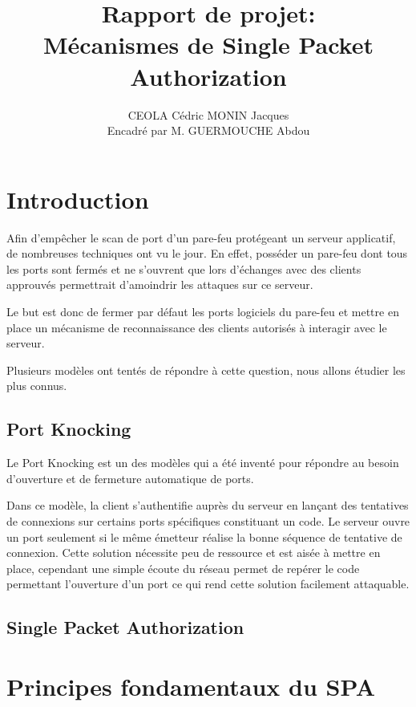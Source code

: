 \documentclass[12pt]{article}
\title{Rapport de projet:\\
Mécanismes de Single Packet Authorization}
\author{CEOLA Cédric MONIN Jacques\\
Encadré par M. GUERMOUCHE Abdou}
\begin{document}
\maketitle

\clearpage                  
\tableofcontents
\clearpage

\section{Introduction}

Afin d'empêcher le scan de port d'un pare-feu protégeant un serveur applicatif, de nombreuses techniques ont vu le jour. En effet, posséder un pare-feu dont tous les ports sont fermés et ne s'ouvrent que lors d'échanges avec des clients approuvés permettrait d'amoindrir les attaques sur ce serveur.

Le but est donc de fermer par défaut les ports logiciels du pare-feu et mettre en place un mécanisme de reconnaissance des clients autorisés à interagir avec le serveur.

Plusieurs modèles ont tentés de répondre à cette question, nous allons étudier les plus connus.

\subsection{Port Knocking}

Le Port Knocking est un des modèles qui a été inventé pour répondre au besoin d'ouverture et de fermeture automatique de ports.

Dans ce modèle, la client s'authentifie auprès du serveur en lançant des tentatives de connexions sur certains ports spécifiques constituant un code. Le serveur ouvre un port seulement si le même émetteur réalise la bonne séquence de tentative de connexion.
Cette solution nécessite peu de ressource et est aisée à mettre en place, cependant une simple écoute du réseau permet de repérer le code permettant l'ouverture d'un port ce qui rend cette solution facilement attaquable.

\subsection{Single Packet Authorization}

\clearpage

\section{Principes fondamentaux du SPA}
 
\end{document}
